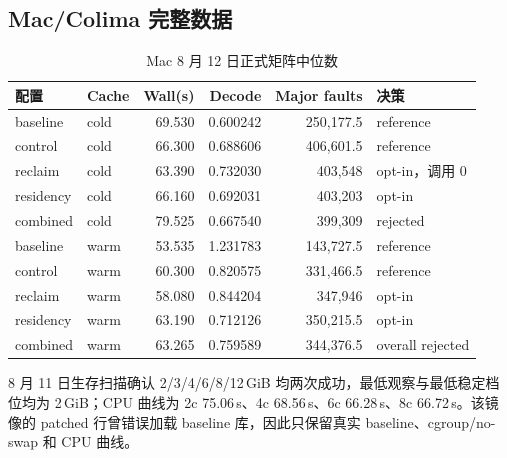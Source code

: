\subsection{Mac/Colima 完整数据}

\begin{table}[H]
  \centering
  \scriptsize
  \caption{Mac 8 月 12 日正式矩阵中位数}
  \label{tab:appendix-mac-finals}
  \begin{tabular}{llrrrp{}}
    \toprule
    配置 & Cache & Wall(s) & Decode & Major faults & 决策 \\
    \midrule
    baseline & cold & 69.530 & 0.600242 & 250,177.5 & reference \\
    control & cold & 66.300 & 0.688606 & 406,601.5 & reference \\
    reclaim & cold & 63.390 & 0.732030 & 403,548 & opt-in，调用 0 \\
    residency & cold & 66.160 & 0.692031 & 403,203 & opt-in \\
    combined & cold & 79.525 & 0.667540 & 399,309 & rejected \\
    baseline & warm & 53.535 & 1.231783 & 143,727.5 & reference \\
    control & warm & 60.300 & 0.820575 & 331,466.5 & reference \\
    reclaim & warm & 58.080 & 0.844204 & 347,946 & opt-in \\
    residency & warm & 63.190 & 0.712126 & 350,215.5 & opt-in \\
    combined & warm & 63.265 & 0.759589 & 344,376.5 & overall rejected \\
    \bottomrule
  \end{tabular}
\end{table}

8 月 11 日生存扫描确认 2/3/4/6/8/12\,GiB 均两次成功，最低观察与最低稳定档位均为 2\,GiB；CPU 曲线为 2c 75.06\,s、4c 68.56\,s、6c 66.28\,s、8c 66.72\,s。该镜像的 patched 行曾错误加载 baseline 库，因此只保留真实 baseline、cgroup/no-swap 和 CPU 曲线。

